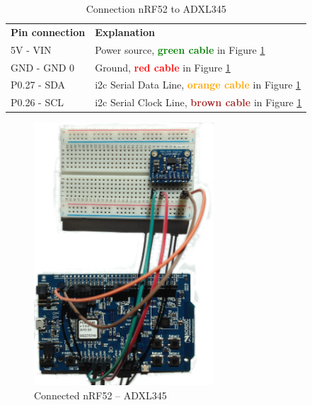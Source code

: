 \begin{table}[H]
\centering
\caption{Connection nRF52 to ADXL345}
\label{nRF52ADXL345connection}
\begin{tabular}{ll}
\textbf{Pin connection} & \textbf{Explanation}                                                                                            \\
5V - VIN               & Power source, \textbf{\textcolor{green}{green cable}} in Figure \ref{fig:nrf-adxl345}                   \\
GND - GND           0   & Ground, \textbf{\textcolor{red}{red cable}} in Figure \ref{fig:nrf-adxl345}                             \\
P0.27 - SDA            & \gls{i2c} Serial Data Line, \textbf{\textcolor{orange}{orange cable}} in Figure \ref{fig:nrf-adxl345} \\
P0.26 - SCL            & \gls{i2c} Serial Clock Line, \textbf{\textcolor{brown}{brown cable}} in Figure \ref{fig:nrf-adxl345} 
\end{tabular}
\end{table}



\begin{figure}[ht]
    \centering
    \includegraphics[width=0.6\textwidth]{connectionADXL-nrf4.png}    
    \caption{Connected nRF52 -- ADXL345}
    \label{fig:nrf-adxl345}
\end{figure}

